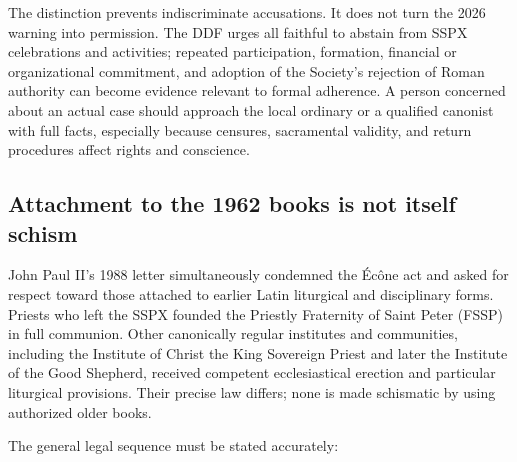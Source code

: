 The distinction prevents indiscriminate accusations. It does not turn the 2026 warning into permission. The DDF urges all faithful to abstain from SSPX celebrations and activities; repeated participation, formation, financial or organizational commitment, and adoption of the Society's rejection of Roman authority can become evidence relevant to formal adherence. A person concerned about an actual case should approach the local ordinary or a qualified canonist with full facts, especially because censures, sacramental validity, and return procedures affect rights and conscience.

\subsection{Attachment to the 1962 books is not itself schism}

John Paul II's 1988 letter simultaneously condemned the Écône act and asked for respect toward those attached to earlier Latin liturgical and disciplinary forms. Priests who left the SSPX founded the Priestly Fraternity of Saint Peter (FSSP) in full communion. Other canonically regular institutes and communities, including the Institute of Christ the King Sovereign Priest and later the Institute of the Good Shepherd, received competent ecclesiastical erection and particular liturgical provisions. Their precise law differs; none is made schismatic by using authorized older books.

The general legal sequence must be stated accurately:

